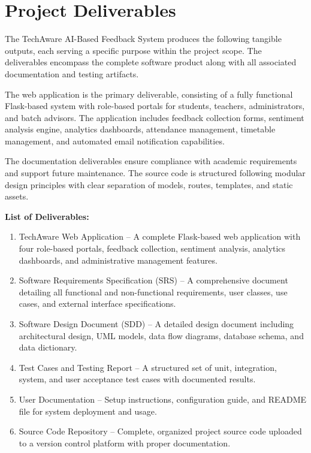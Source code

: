 
\section{Project Deliverables}

The TechAware AI-Based Feedback System produces the following tangible outputs, each serving a specific purpose within the project scope. The deliverables encompass the complete software product along with all associated documentation and testing artifacts.

The web application is the primary deliverable, consisting of a fully functional Flask-based system with role-based portals for students, teachers, administrators, and batch advisors. The application includes feedback collection forms, sentiment analysis engine, analytics dashboards, attendance management, timetable management, and automated email notification capabilities.

The documentation deliverables ensure compliance with academic requirements and support future maintenance. The source code is structured following modular design principles with clear separation of models, routes, templates, and static assets.


\textbf{List of Deliverables:}

\begin{enumerate}
    \item TechAware Web Application – A complete Flask-based web application with four role-based portals, feedback collection, sentiment analysis, analytics dashboards, and administrative management features.
    \item Software Requirements Specification (SRS) – A comprehensive document detailing all functional and non-functional requirements, user classes, use cases, and external interface specifications.
    \item Software Design Document (SDD) – A detailed design document including architectural design, UML models, data flow diagrams, database schema, and data dictionary.
    \item Test Cases and Testing Report – A structured set of unit, integration, system, and user acceptance test cases with documented results.
    \item User Documentation – Setup instructions, configuration guide, and README file for system deployment and usage.
    \item Source Code Repository – Complete, organized project source code uploaded to a version control platform with proper documentation.
\end{enumerate}



